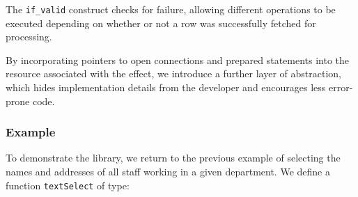 \noindent
The \texttt{if\_valid} construct checks for failure,
allowing different operations to be executed depending on whether or not a row
was successfully fetched for processing.





By incorporating pointers to open connections and prepared statements into the
resource associated with the effect, we introduce a further layer of
abstraction, which hides implementation details from the developer and
encourages less error-prone code. 

\subsubsection{Example}

To demonstrate the 
library, we return to the previous example of selecting the names and addresses
of all staff working in a given department. 
We define a function \texttt{textSelect} of type:

